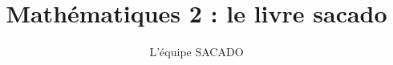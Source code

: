 





\title{Mathématiques 2  : le livre sacado}
\author{L'équipe SACADO}



\maketitle

%
%

 
%
%
%


